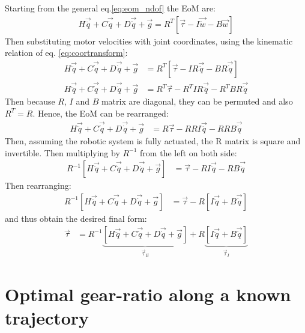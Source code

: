 Starting from the general eq.\eqref{eq:eom_ndof} the EoM are:
%
\begin{align}
H \vec{ \ddot{q} } + C\vec{ \dot{q} } + D \vec{ \dot{q} } + \vec{ g }
		= R^T  \left[ 
		\vec{ \tau } - I \vec{ \dot{w} } - B \vec{ w }       
		\right]
\end{align}
%
Then substituting motor velocities with joint coordinates, using the kinematic relation of eq. \eqref{eq:coortransform}:
%
\begin{align}
H \vec{ \ddot{q} } + C\vec{ \dot{q} } + D \vec{ \dot{q} } + \vec{ g }
		&= R^T  \left[ 
		\vec{ \tau } - I R \vec{ \ddot{q} } - B R\vec{ \dot{q} }       
		\right] \\
H \vec{ \ddot{q} } + C\vec{ \dot{q} } + D \vec{ \dot{q} } + \vec{ g }
		&= R^T \vec{ \tau } - R^T I R \vec{ \ddot{q} } - R^T B R \vec{ \dot{q} }  
\end{align}
%
Then because $R$, $I$ and $B$ matrix are diagonal, they can be permuted and also $R^T=R$. Hence, the EoM can be rearranged:
%
\begin{align}
H \vec{ \ddot{q} } + C\vec{ \dot{q} } + D \vec{ \dot{q} } + \vec{ g }
		&= R \vec{ \tau } - R R I \vec{ \ddot{q} } - R R B \vec{ \dot{q} }  
\end{align}
%
Then, assuming the robotic system is fully actuated, the R matrix is square and invertible. Then multiplying by $R^{-1}$ from the left on both side:
%
\begin{align}
R^{-1} \left[ H \vec{ \ddot{q} } + C\vec{ \dot{q} } + D \vec{ \dot{q} } + \vec{ g } \right]
		&= \vec{ \tau } - R I \vec{ \ddot{q} } - R B \vec{ \dot{q} }  
\end{align}
%
Then rearranging:
%
\begin{align}
R^{-1} \left[ H \vec{ \ddot{q} } + C\vec{ \dot{q} } + D \vec{ \dot{q} } + \vec{ g } \right]
		&= \vec{ \tau } - R  \left[ I \vec{ \ddot{q} } + B \vec{ \dot{q} }  \right]
\end{align}
%
and thus obtain the desired final form:
%
\begin{align}
\vec{ \tau } &=  R^{-1} \underbrace{ \left[ H \vec{ \ddot{q} } + C\vec{ \dot{q} } + D \vec{ \dot{q} } + \vec{ g } \right] }_{\vec{\tau}_E}
 + R \underbrace{ \left[ I \vec{ \ddot{q} } + B \vec{ \dot{q} }  \right]}_{\vec{\tau}_I}
\end{align}
%



\newpage
\section{Optimal gear-ratio along a known trajectory}
\label{sec:optgearproof}

